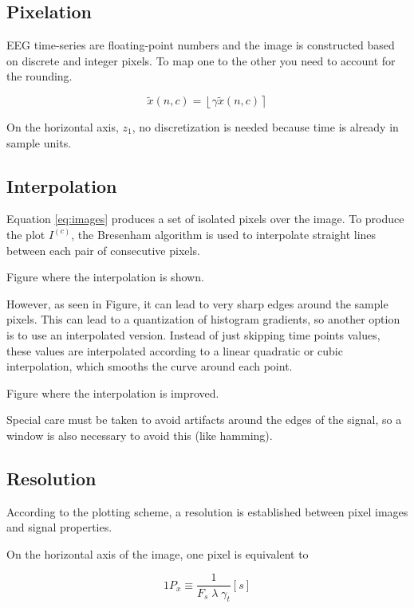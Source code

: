 \subsection{Pixelation}

EEG time-series are floating-point numbers and the image is constructed based on discrete and integer pixels.  To map one to the other you need to account for the rounding.

\begin{equation}
\tilde{x}(n,c) = \left \lfloor{ \gamma  \tilde{x}(n,c)  }\right \rceil
\label{eq:standarizedaverages}
\end{equation}

On the horizontal axis, $z_1$, no discretization is needed because time is already in sample units. 

\subsection{Interpolation}

Equation \ref{eq:images} produces a set of isolated pixels over the image.  To produce the plot $I^{(c)}$, the Bresenham \cite{Bresenham1965,Ramele2016} algorithm is used to interpolate straight lines between each pair of consecutive pixels.

Figure where the interpolation is shown.

However, as seen in Figure, it can lead to very sharp edges around the sample pixels.  This can lead to a quantization of histogram gradients, so another option is to use an interpolated version.  Instead of just skipping time points values, these values are interpolated according to a linear quadratic or cubic interpolation, which smooths the curve around each point.

Figure where the interpolation is improved.

Special care must be taken to avoid artifacts around the edges of the signal, so a window is also necessary to avoid this (like hamming).

\subsection{Resolution}

According to the plotting scheme, a resolution is established between pixel images and signal properties.

On the horizontal axis of the image, one pixel is equivalent to 

\begin{equation}
1 P_x \equiv \frac{1}{F_s \; \lambda \; \gamma_t}  [\si{s}]
\label{eq:resolutionx}
\end{equation}

